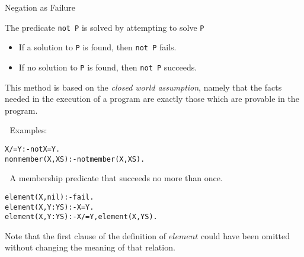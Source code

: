 \documentclass{popl}
\newenvironment{smalltt}{\begin{alltt}\smaller}{\end{alltt}}
\begin{document}
\begin{foil} 
\begin{cframed}
Negation as Failure
\end{cframed}

The predicate {\tt not P} is solved by attempting to solve {\tt P}
\begin{itemize}
\item If a solution to {\tt P} is found, then {\tt not P} fails.
\item If no solution to {\tt P} is found, then {\tt not P} succeeds.
\end{itemize}

\begin{note}
This method is based on the {\it closed world assumption}, namely that
the facts needed in the execution of a program are exactly those 
which are provable in the program.
\end{note}

Examples:
\begin{smalltt}
        X /= Y :- not X=Y.
        nonmember(X, XS) :- not member(X, XS).
\end{smalltt}

A membership predicate that succeeds no more than once.
\begin{smalltt}
        element(X, nil)  :- fail.
        element(X, Y:YS) :- X=Y.
        element(X, Y:YS) :- X/=Y, element(X, YS).
\end{smalltt}
\begin{note}
Note that the first clause of the definition of $element$ 
could have been omitted without changing the meaning 
of that relation.
\end{note}
\end{foil}
\end{document}
